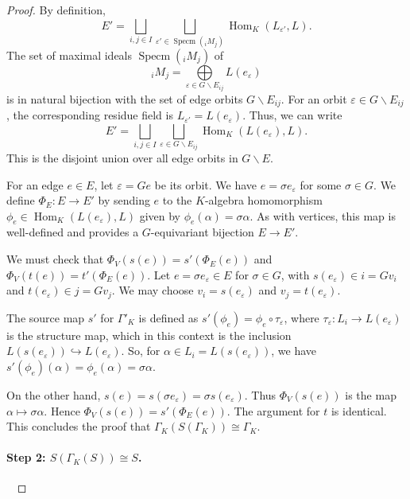 \documentclass[a4paper,12pt,reqno]{amsart}
\DeclareMathOperator{\Specm}{\mathrm{Specm}}
\DeclareMathOperator{\Hom}{\mathrm{Hom}}
\theoremstyle{plain}
\theoremstyle{remark}
\begin{document}
\begin{proof}
    \smallskip
     By definition,
    \[
    E' = \bigsqcup\limits_{i,j\in I}\bigsqcup\limits_{\varepsilon'\in\Specm({}_iM_j)}\Hom_{K}(L_{\varepsilon'},L).
    \]
    The set of maximal ideals $\Specm({}_iM_j)$ of
    \[
      {}_iM_j = \bigoplus\limits_{\varepsilon \in G\backslash E_{ij}} L(e_\varepsilon)
    \]
    is in natural bijection with the set of edge orbits $G\backslash E_{ij}$. For an orbit $\varepsilon \in G\backslash E_{ij}$, the corresponding residue field is $L_{\varepsilon'} = L(e_\varepsilon)$. Thus, we can write
    \[
    E' = \bigsqcup\limits_{i,j\in I}\bigsqcup_{\varepsilon \in G\backslash E_{ij}} \Hom_{K}(L(e_\varepsilon),L).
    \]
    This is the disjoint union over all edge orbits in $G\backslash E$.

    For an edge $e\in E$, let $\varepsilon=Ge$ be its orbit. We have $e=\sigma e_\varepsilon$ for some $\sigma\in G$. We define $\Phi_E\colon E \to E'$ by sending $e$ to the $K$-algebra homomorphism $\phi_e \in \Hom_{K}(L(e_\varepsilon),L)$ given by $\phi_e(\alpha)=\sigma \alpha$. As with vertices, this map is well-defined and provides a $G$-equivariant bijection $E \to E'$.

    \smallskip
     We must check that $\Phi_V(s(e)) = s'(\Phi_E(e))$ and $\Phi_V(t(e)) = t'(\Phi_E(e))$. Let $e=\sigma e_\varepsilon \in E$ for $\sigma\in G$, with $s(e_\varepsilon)\in i=Gv_i$ and $t(e_\varepsilon)\in j=Gv_j$. We may choose $v_i=s(e_\varepsilon)$ and $v_j=t(e_\varepsilon)$.
    
    The source map $s'$ for $\Gamma'_K$ is defined as $s'(\phi_e) = \phi_e \circ \tau_\varepsilon$, where $\tau_\varepsilon\colon L_i \to L(e_\varepsilon)$ is the structure map, which in this context is the inclusion $L(s(e_\varepsilon))\hookrightarrow L(e_\varepsilon)$.
So, for $\alpha\in L_i = L(s(e_\varepsilon))$, we have $s'(\phi_e)(\alpha) = \phi_e(\alpha) = \sigma \alpha$.

    On the other hand, $s(e) = s(\sigma e_\varepsilon)=\sigma s(e_\varepsilon)$. Thus $\Phi_V(s(e))$ is the map $\alpha \mapsto \sigma \alpha$. Hence $\Phi_V(s(e)) = s'(\Phi_E(e))$. The argument for $t$ is identical. This concludes the proof that $\Gamma_K(S(\Gamma_K))\cong \Gamma_K$.

    \paragraph{Step 2: $S(\Gamma_K(S)) \cong S$.}\ 


\end{proof}
\end{document}
